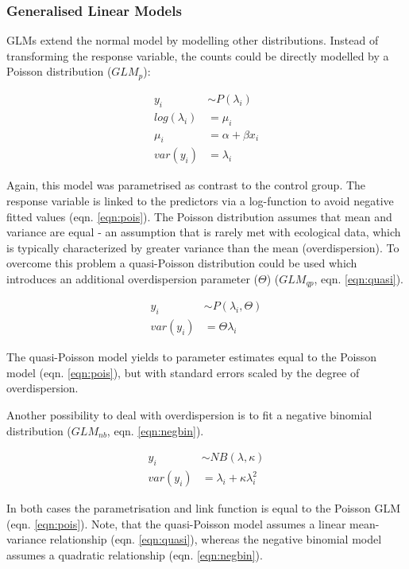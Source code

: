 \documentclass[twocolumn, natbib]{svjour3}
\begin{document}
\subsubsection{Generalised Linear Models}
GLMs extend the normal model by modelling other distributions.
Instead of transforming the response variable, the counts could be directly modelled by a Poisson distribution ($GLM_p$):

\begin{align}
  y_i &\sim P(\lambda_i) \nonumber \\
  log(\lambda_i) &= \mu_i \label{eqn:pois} \\
  \mu_i &= \alpha + \beta x_i \nonumber \\
  var(y_i) &= \lambda_i \nonumber
\end{align}

Again, this model was parametrised as contrast to the control group. 
The response variable is linked to the predictors via a log-function to avoid negative fitted values (eqn. \ref{eqn:pois}). 
The Poisson distribution assumes that mean and variance are equal - an assumption that is rarely met with ecological data, which is typically characterized by greater variance than the mean (overdispersion).
To overcome this problem a quasi-Poisson distribution could be used which introduces an additional overdispersion parameter ($\Theta$) ($GLM_{qp}$, eqn. \ref{eqn:quasi}).

\begin{align}
  y_i &\sim P(\lambda_i, \Theta) \label{eqn:quasi} \\
  var(y_i) &= \Theta \lambda_i  \nonumber
\end{align}

The quasi-Poisson model yields to parameter estimates equal to the Poisson model (eqn. \ref{eqn:pois}), but with standard errors scaled by the degree of overdispersion.

Another possibility to deal with overdispersion is to fit a negative binomial distribution ($GLM_{nb}$, eqn. \ref{eqn:negbin}).

\begin{align}
  y_i &\sim NB(\lambda, \kappa) \label{eqn:negbin}  \\
  var(y_i) &= \lambda_i + \kappa \lambda_i^2 \nonumber
\end{align}

In both cases the parametrisation and link function is equal to the Poisson GLM (eqn. \ref{eqn:pois}).
Note, that the quasi-Poisson model assumes a linear mean-variance relationship (eqn. \ref{eqn:quasi}), whereas the negative binomial model assumes a quadratic relationship (eqn. \ref{eqn:negbin}).
\end{document}
